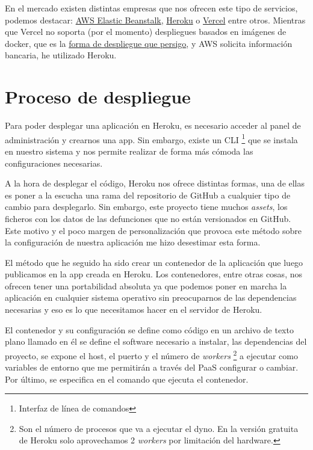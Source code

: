 En el mercado existen distintas empresas que nos ofrecen este tipo de servicios, podemos
destacar: \href{https://aws.amazon.com/es/elasticbeanstalk/}{AWS Elastic Beanstalk},
\href{https://dashboard.heroku.com/login}{Heroku} o \href{https://vercel.com/}{Vercel}
entre otros. Mientras que Vercel no soporta (por el momento) despliegues basados en imágenes de docker,
que es la \hyperref[sec:proceso-despliegue]{forma de despliegue que persigo}, y AWS
solicita información bancaria, he utilizado Heroku.

\section{Proceso de despliegue}
\label{sec:proceso-despliegue}
Para poder desplegar una aplicación en Heroku, es necesario acceder al panel de
administración y crearnos una app. Sin embargo, existe un CLI \footnote{Interfaz de
línea de comandos} que se instala en nuestro sistema y nos permite realizar de forma más
cómoda las configuraciones necesarias.

A la hora de desplegar el código, Heroku nos ofrece distintas formas, una de ellas es
poner a la escucha una rama del repositorio de GitHub a cualquier tipo de cambio para
desplegarlo. Sin embargo, este proyecto tiene muchos \textit{assets}, los ficheros con
los datos de las defunciones que no están versionados en GitHub. Este
motivo y el poco margen de personalización que provoca este método sobre la
configuración de nuestra aplicación me hizo desestimar esta forma.

El método que he seguido ha sido crear un contenedor de la aplicación que luego publicamos
en la app creada en Heroku. Los contenedores, entre otras cosas, nos ofrecen tener una portabilidad absoluta
ya que podemos poner en marcha la aplicación en cualquier sistema operativo sin
preocuparnos de las dependencias necesarias y eso es lo que necesitamos hacer en el
servidor de Heroku.

El contenedor y su configuración se define como código en un archivo de texto plano
llamado  en él se define el software necesario a instalar, las
dependencias del proyecto, se expone el host, el puerto y el número de \textit{workers}
\footnote{Son el número de procesos que va a ejecutar el dyno. En la versión gratuita de Heroku solo aprovechamos 2 \textit{workers} por
limitación del hardware.} a
ejecutar como variables de entorno que me permitirán a través del PaaS configurar o cambiar.
Por último, se especifica en el comando que ejecuta el contenedor.

